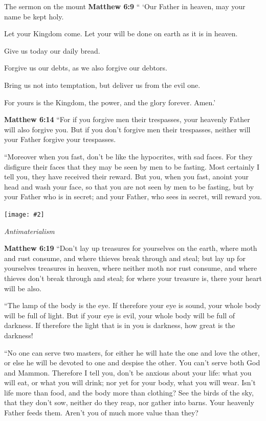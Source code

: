 \documentclass[10pt,twoside]{article} %
\newcommand{\fig}[2][0.4]{
    \ifthenelse{\isodd{\pageref{fig:#2}}}{}{\hfill}
    \texttt{[image: \#2]}\label{fig:#2}
    \ifthenelse{\isodd{\pageref{fig:#2}}}{\hfill}{}
    \par
}
\newcommand{\quotesize}{\normalsize{}}
\newenvironment{quotetext}{\begingroup\quotesize}{\endgroup}
\newcommand{\bible}[2]{\begin{quotetext}\textbf{#1} #2\end{quotetext}}
\newcommand{\matthew}[2]{\bible{Matthew #1}{#2}}
\newcommand{\subhead}[1]{\emph{#1}\par}
\begin{document}
\begin{section}{The sermon on the mount}
\matthew{6:9}{
`` `Our Father in heaven, may your name be kept holy.

   Let your Kingdom come.
Let your will be done on earth as it is in heaven.

   Give us today our daily bread.

   Forgive us our debts,
as we also forgive our debtors.

   Bring us not into temptation,
but deliver us from the evil one.

For yours is the Kingdom, the power, and the glory forever. Amen.'
}

\matthew{6:14}{
   ``For if you forgive men their trespasses, your heavenly Father will also forgive you.    But if you don't forgive men their trespasses, neither will your Father forgive your trespasses.

   ``Moreover when you fast, don't be like the hypocrites, with sad faces. For they disfigure their faces that they may be seen by men to be fasting. Most certainly I tell you, they have received their reward.    But you, when you fast, anoint your head and wash your face,    so that you are not seen by men to be fasting, but by your Father who is in secret; and your Father, who sees in secret, will reward you.}

\fig{mammon}

\subhead{Antimaterialism}

\matthew{6:19}{
   ``Don't lay up treasures for yourselves on the earth, where moth and rust consume, and where thieves break through and steal;    but lay up for yourselves treasures in heaven, where neither moth nor rust consume, and where thieves don't break through and steal;    for where your treasure is, there your heart will be also.

   ``The lamp of the body is the eye. If therefore your eye is sound, your whole body will be full of light.    But if your eye is evil, your whole body will be full of darkness. If therefore the light that is in you is darkness, how great is the darkness!

   ``No one can serve two masters, for either he will hate the one and love the other, or else he will be devoted to one and despise the other. You can't serve both God and Mammon.    Therefore I tell you, don't be anxious about your life: what you will eat, or what you will drink; nor yet for your body, what you will wear. Isn't life more than food, and the body more than clothing?    See the birds of the sky, that they don't sow, neither do they reap, nor gather into barns. Your heavenly Father feeds them. Aren't you of much more value than they?

}
\end{section}
\end{document}
